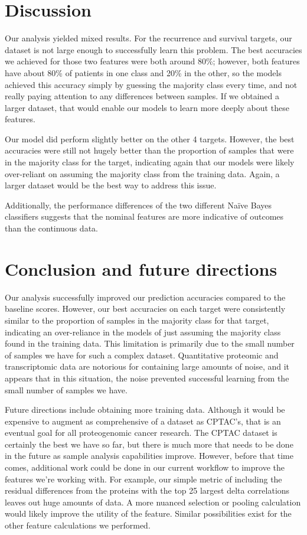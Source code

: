 \documentclass{article}
\begin{document}
\section{Discussion}

Our analysis yielded mixed results. For the recurrence and survival targets, our dataset is not large enough to successfully learn this problem. The best accuracies we achieved for those two features were both around 80\%; however, both features have about 80\% of patients in one class and 20\% in the other, so the models achieved this accuracy simply by guessing the majority class every time, and not really paying attention to any differences between samples. If we obtained a larger dataset, that would enable our models to learn more deeply about these features.

Our model did perform slightly better on the other 4 targets. However, the best accuracies were still not hugely better than the proportion of samples that were in the majority class for the target, indicating again that our models were likely over-reliant on assuming the majority class from the training data. Again, a larger dataset would be the best way to address this issue.

Additionally, the performance differences of the two different Naïve Bayes classifiers suggests that the nominal features are more indicative of outcomes than the continuous data.

\section{Conclusion and future directions}

Our analysis successfully improved our prediction accuracies compared to the baseline scores. However, our best accuracies on each target were consistently similar to the proportion of samples in the majority class for that target, indicating an over-reliance in the models of just assuming the majority class found in the training data. This limitation is primarily due to the small number of samples we have for such a complex dataset. Quantitative proteomic and transcriptomic data are notorious for containing large amounts of noise, and it appears that in this situation, the noise prevented successful learning from the small number of samples we have.

Future directions include obtaining more training data. Although it would be expensive to augment as comprehensive of a dataset as CPTAC's, that is an eventual goal for all proteogenomic cancer research. The CPTAC dataset is certainly the best we have so far, but there is much more that needs to be done in the future as sample analysis capabilities improve. However, before that time comes, additional work could be done in our current workflow to improve the features we're working with. For example, our simple metric of including the residual differences from the proteins with the top 25 largest delta correlations leaves out huge amounts of data. A more nuanced selection or pooling calculation would likely improve the utility of the feature. Similar possibilities exist for the other feature calculations we performed.



\end{document}
